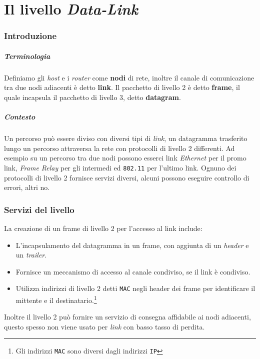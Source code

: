 \chapter{Il livello \textit{Data-Link}}
\label{ch:livelloDataLink}

    \subsection{Introduzione}
        \paragraph{Terminologia} Definiamo gli \textit{host} e i \textit{router} come \textbf{nodi} di rete, inoltre il canale di comunicazione tra due nodi adiacenti è detto \textbf{link}. Il pacchetto di livello 2 è detto \textbf{frame}, il quale incapsula il pacchetto di livello 3, detto \textbf{datagram}.
        \paragraph{Contesto} Un percorso può essere diviso con diversi tipi di \textit{link}, un datagramma trasferito lungo un percorso attraversa la rete con protocolli di livello 2 differenti. Ad esempio su un percorso tra due nodi possono esserci link \textit{Ethernet} per il promo link, \textit{Frame Relay} per gli intermedi ed \texttt{802.11} per l'ultimo link. Ognuno dei protocolli di livello 2 fornisce servizi diversi, alcuni possono eseguire controllo di errori, altri no.
    \subsection{Servizi del livello}
        La creazione di un frame di livello 2 per l'accesso al link include:
        \begin{itemize}
            \item L'incapsulamento del datagramma in un frame, con aggiunta di un \textit{header} e un \textit{trailer}.
            \item Fornisce un meccanismo di accesso al canale condiviso, se il link è condiviso.
            \item Utilizza indirizzi di livello 2 detti \texttt{MAC} negli header dei frame per identificare il mittente e il destinatario.\footnote{Gli indirizzi \texttt{MAC} sono diversi dagli indirizzi \texttt{IP}}
        \end{itemize}
        Inoltre il livello 2 può fornire un servizio di consegna affidabile ai nodi adiacenti, questo spesso non viene usato per \textit{link} con basso tasso di perdita.
